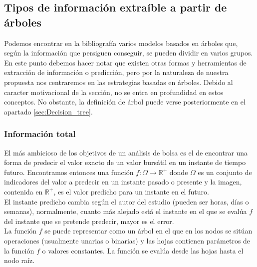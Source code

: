 \subsection{Tipos de informaci\'on extra\'ible a partir de \'arboles}
Podemos encontrar en la bibliograf\'ia varios modelos basados en \'arboles que, seg\'un la informaci\'on que persiguen conseguir, se pueden dividir en varios grupos. En este punto debemos hacer notar que existen otras formas y herramientas de extracci\'on de informaci\'on o predicci\'on, pero por la naturaleza de nuestra propuesta nos centraremos en las estrategias basadas en \'arboles. Debido al caracter motivacional de la secci\'on, no se entra en profundidad en estos conceptos. No obstante, la definici\'on de \'arbol puede verse posteriormente en el apartado \ref{sec:Decision_tree}.

    \subsubsection{Informaci\'on total}
    
    El m\'as ambicioso de los objetivos de un an\'alisis de bolsa es el de encontrar una forma de predecir el valor exacto de un valor burs\'atil en un instante de tiempo futuro. Encontramos entonces una funci\'on $f:\Omega \rightarrow \mathbb{R}^+$ donde $\Omega$ es un conjunto de indicadores del valor a predecir en un instante pasado o presente y la imagen, contenida en $\mathbb{R}^+$, es el valor predicho para un instante en el futuro.\\
    
    El instante predicho cambia seg\'un el autor del estudio (pueden ser horas, d\'ias o semanas), normalmente, cuanto m\'as alejado est\'a el instante en el que se eval\'ua $f$ del instante que se pretende predecir, mayor es el error.\\
    
    La funci\'on $f$ se puede representar como un \'arbol en el que en los nodos se sit\'uan operaciones (usualmente unarias o binarias) y las hojas contienen par\'ametros de la funci\'on $f$ o valores constantes. La funci\'on se eval\'ua desde las hojas hasta el nodo ra\'iz. \\
    
